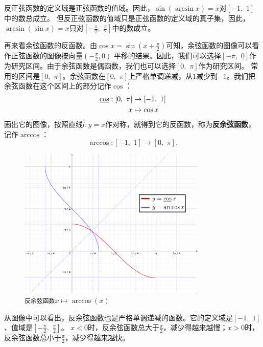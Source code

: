 \documentclass[12pt,UTF8]{ctexbook}
\begin{document}
反正弦函数的定义域是正弦函数的值域。因此，$\sin{(\arcsin{x})} = x$对$[-1,\,\, 1]$中的数总成立。
但反正弦函数的值域只是正弦函数的定义域的真子集，因此，$\arcsin{(\sin{x})} = x$只对$[-\frac{\pi}{2}, \,\, \frac{\pi}{2}]$中的数成立。

再来看余弦函数的反函数。由$\cos{x} = \sin(x+\frac{\pi}{2})$可知，余弦函数的图像可以看作正弦函数的图像按向量$\left(-\frac{\pi}{2}, 0\right)$
平移的结果。因此，我们可以选择$[-\pi, \,\, 0]$作为研究区间。由于余弦函数是偶函数，我们也可以选择$[0,\,\,\pi]$作为研究区间。
常用的区间是$[0,\,\,\pi]$。余弦函数在$[0,\,\,\pi]$上严格单调递减，从$1$减少到$-1$。我们把余弦函数在这个区间上的部分记作$\underline{\cos}$：
\begin{align}
    \underline{\cos} : [0,\,\,\pi] &\rightarrow [-1,\,\, 1]\notag \\                                  x &\mapsto \cos{x} \notag
\end{align}
画出它的图像，按照直线$l: y = x$作对称，就得到它的反函数，称为\textbf{反余弦函数}，记作$\arccos$：
$$ \arccos : [-1,\,\, 1] \rightarrow [0,\,\,\pi] . $$

\begin{figure}[h] %
    \vspace{4pt}
    \centering
    \includegraphics[width=0.8\textwidth]{反余弦函数1.png}
    \caption*{\texttt{反余弦函数}$x\mapsto \arccos(x)$}
\end{figure}

从图像中可以看出，反余弦函数也是严格单调递减的函数。它的定义域是$[-1,\,\, 1]$、值域是$[-\frac{\pi}{2}, \,\, \frac{\pi}{2}]$。
$x < 0$时，反余弦函数总大于$\frac{\pi}{2}$，减少得越来越慢；$x > 0$时，反余弦函数总小于$\frac{\pi}{2}$，减少得越来越快。
\end{document}
